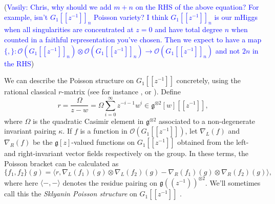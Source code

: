 \documentclass[11pt, oneside, reqno]{amsart}
\theoremstyle{definition} \newtheorem{definition}{Definition}[section]
\theoremstyle{definition} \newtheorem{remark}[definition]{Remark}
\theoremstyle{definition} \newtheorem{remarks}[definition]{Remarks}
\theoremstyle{definition} \newtheorem{question}[definition]{Question}
\theoremstyle{definition} \newtheorem*{note}{Note}
\theoremstyle{definition} \newtheorem{example}[definition]{Example}
\theoremstyle{definition} \newtheorem{examples}[definition]{Examples}
\renewcommand{\gg}{\mathfrak{g}}
\newcommand{\OO}{\mathcal{O}}
\newcommand{\vasily}[1]{(\textcolor{blue}{Vasily: #1})}
\begin{document}
\vasily{Chris, why should we add $m+n$ on the RHS of the above equation? For example, isn't $G_1[[z^{-1}]]_n$ Poisson variety? I think $G_1[[z^{-1}]]_n$ is our
  mHiggs when all singularities are concentrated at $z=0$
  and have total degree $n$ when counted in a faithful representation
  you've chosen. Then we expect
to have a map 
$\{,\} \colon \OO(G_1[[z^{-1}]]_n) \otimes \OO(G_1[[z^{-1}]]_n) \to \OO(G_1[[z^{-1}]]_{n})$
and not $2n$ in the RHS} 

We can describe the Poisson structure on $G_1[[z^{-1}]]$ concretely, using the rational classical $r$-matrix (see for instance \cite{GelfandCherednik,DrinfeldICM}, or \cite{Shapiro}).  Define
\[r = \frac \Omega{z-w} = \Omega \sum_{i=0}^\infty z^{-i-1}w^i \in \gg^{\otimes 2}[w][[z^{-1}]],\] 
where $\Omega$ is the quadratic Casimir element in $\gg^{\otimes 2}$ associated to a non-degenerate invariant pairing $\kappa$.  If $f$ is a function in $\OO(G_1[[z^{-1}]])$, let $\nabla_L(f)$ and $\nabla_R(f)$ be the $\gg[z]$-valued functions on $G_1[[z^{-1}]]$ obtained from the left- and right-invariant vector fields respectively on the group.  In these terms, the Poisson bracket can be calculated as 
\[\{f_1, f_2\}(g) = \langle r, \nabla_L(f_1)(g) \otimes \nabla_L(f_2)(g) - \nabla_R(f_1)(g) \otimes \nabla_R(f_2)(g)\rangle,\]
where here $\langle - , - \rangle$ denotes the residue pairing on $\gg(\!(z^{-1})\!)^{\otimes 2}$.  We'll sometimes call this the \emph{Sklyanin Poisson structure} on $G_1[[z^{-1}]]$ \cite{Sklyanin}.
\end{document}
